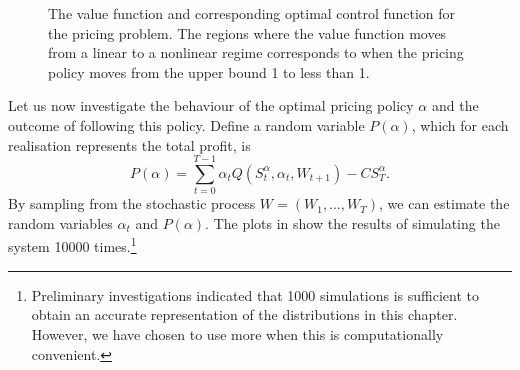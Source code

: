 \documentclass[main.tex]{subfiles}
\begin{document}
\begin{figure}[htbp]
\begin{subfigure}[b]{0.5\textwidth}
  \end{subfigure}
  \caption{The value function and corresponding
    optimal control function for the pricing problem.
    The regions where the value function moves from a linear to a
    nonlinear regime
    corresponds to when the pricing policy moves from the upper bound
    \num{1} to less than \num{1}.
  }\label{fig:markdown_bellman}
\end{figure}
Let us now investigate the behaviour of the optimal pricing policy
$\alpha$ and
the outcome of following this policy.
Define a random variable $P(\alpha)$, which for each realisation
represents the total profit, is
\begin{equation}
  P(\alpha) = \sum_{t=0}^{T-1}\alpha_tQ(S_t^\alpha,\alpha_t,W_{t+1}) - CS_T^\alpha.
\end{equation}
By sampling from the stochastic process $W=(W_1,\dots,W_T)$, we can
estimate the random variables $\alpha_t$ and $P(\alpha)$.
The plots in  show the results of
simulating the system \num{10000} times.\footnote{Preliminary
  investigations indicated that \num{1000}
  simulations is sufficient to obtain an accurate representation of
  the distributions in this chapter. However, we have chosen to use
  more when this is computationally convenient.
}
\end{document}

